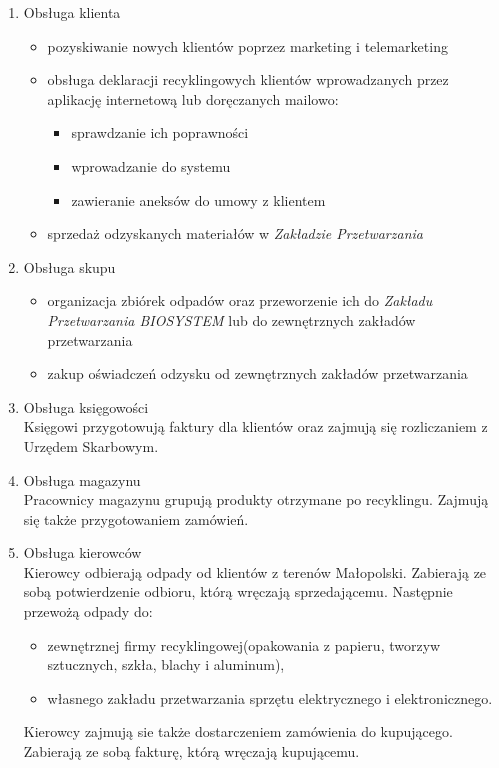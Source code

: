 

\begin{enumerate}
	\item Obsługa klienta
		\begin{itemize}
			\item pozyskiwanie nowych klientów poprzez marketing i telemarketing
			\item obsługa deklaracji recyklingowych klientów wprowadzanych przez aplikację internetową lub doręczanych mailowo: 
				\begin{itemize}
					\item sprawdzanie ich poprawności
					\item wprowadzanie do systemu
					\item zawieranie aneksów do umowy z klientem
				\end{itemize}
			\item sprzedaż odzyskanych materiałów w \emph{Zakładzie Przetwarzania}
		\end{itemize}

	\item Obsługa skupu
		\begin{itemize}
			\item organizacja zbiórek odpadów oraz przeworzenie ich do \emph{Zakładu Przetwarzania BIOSYSTEM} lub do zewnętrznych zakładów przetwarzania
			\item zakup oświadczeń odzysku od zewnętrznych zakładów przetwarzania
		\end{itemize}

	\item Obsługa księgowości \\
	Księgowi przygotowują faktury dla klientów oraz zajmują się rozliczaniem z Urzędem Skarbowym.

	\item Obsługa magazynu \\
	Pracownicy magazynu grupują produkty otrzymane po recyklingu. Zajmują się także przygotowaniem zamówień.

	\item Obsługa kierowców \\
	Kierowcy odbierają odpady od klientów z terenów Małopolski. Zabierają ze sobą potwierdzenie odbioru, którą wręczają sprzedającemu. Następnie przewożą odpady do:
		\begin{itemize}
			\item zewnętrznej firmy recyklingowej(opakowania z papieru, tworzyw sztucznych, szkła, blachy i aluminum),
			\item własnego zakładu przetwarzania sprzętu elektrycznego i elektronicznego.
		\end{itemize}
	Kierowcy zajmują sie także dostarczeniem zamówienia do kupującego. Zabierają ze sobą fakturę, którą wręczają kupującemu.

\end{enumerate}
